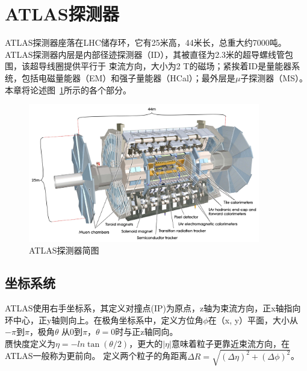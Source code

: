 \section{ATLAS探测器} \label{sec:ATLAS}
ATLAS探测器座落在LHC储存环，它有25米高，44米长，总重大约7000吨。ATLAS探测器内层是内部径迹探测器（ID），其被直径为2.3米的超导螺线管包围，该超导线圈提供平行于
束流方向，大小为2 T的磁场；紧挨着ID是量能器系统，包括电磁量能器（EM）和强子量能器（HCal）；最外层是$\mu$子探测器（MS）。本章将论述图~\ref{fig:ATLAS_schematic}所示的各个部分。

\begin{figure}[h]
\begin{center}
\includegraphics[width=0.9\textwidth]{fig/ATLAS_SE_Corrected7.pdf}
\caption{ATLAS探测器简图} \label{fig:ATLAS_schematic}
\end{center}
\end{figure}

\subsection{坐标系统}
ATLAS使用右手坐标系，其定义对撞点(IP)为原点，z轴为束流方向，正x轴指向环中心，正y轴则向上。在极角坐标系中，定义方位角$\phi$在（x, y）平面，大小从$-\pi$到$\pi$，极角$\theta$
从0到$\pi$，$\theta=0$时与正z轴同向。\\
赝快度定义为$\eta = -ln\tan(\theta/2)$，更大的$|\eta|$意味着粒子更靠近束流方向，在ATLAS一般称为更前向。
定义两个粒子的角距离$\Delta R=\sqrt{(\Delta\eta)^2+(\Delta\phi)^2}$。

